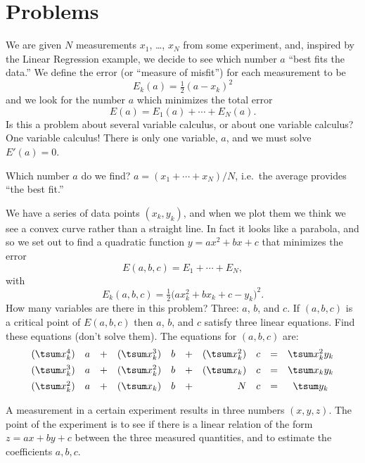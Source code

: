 \section{Problems} 
\begin{multicols}{2}
\problemfont
\problem  We are given $N$ measurements $x_1$, \ldots, $x_N$  
from some experiment, and, inspired by the Linear Regression example,
we decide to see which number $a$ ``best fits the data.''  We define
the error (or ``measure of misfit'') for each measurement to be
\[
E_k(a) = \tfrac12(a-x_k)^2
\]
and we look for the number $a$ which minimizes the total error
\[
E(a) = E_1(a) + \cdots + E_N(a).
\]
\subprob  Is this a problem about several variable calculus, or about 
one variable calculus?
\answer  
One variable calculus!  There is only one variable, $a$, and we must
solve $E'(a) = 0$.
\endanswer

\subprob Which number $a$ do we find? 
\answer  
$a= (x_1+\cdots+x_N)/N$, i.e.\ the average provides ``the best fit.''
\endanswer

\problem We have a series of data points $(x_k, y_k)$,  
and when we plot them we think we see a convex curve rather than a
straight line.  In fact it looks like a parabola, and so we
set out to find a quadratic function $y=ax^2+bx+c$ that minimizes the
error
\[
E(a,b,c)=E_1+\cdots+E_N,
\]
with
\[
E_k(a, b, c) = \tfrac12\bigl(ax_k^2+bx_k+c - y_k\bigr)^2.
\]
\subprob How many variables are there in this problem? 
\answer Three:  $a$, $b$, and $c$. 
\endanswer
\subprob If $(a, b, c)$ is a critical point of $E(a, b, c)$  
then $a$, $b$, and $c$ satisfy three linear equations.  Find these
equations (don't solve them).
\answer The equations for $(a, b, c)$ are:   
\[
\begin{array}{rlcrlcrlrcl}
    (\tsum x_k^4)&a &+&(\tsum x_k^3)&b &+& (\tsum x_k^2)&c 
    &=& \tsum x_k^2y_k\\[1ex]
    (\tsum x_k^3)&a &+&(\tsum x_k^2)&b &+& (\tsum x_k)&c 
    &=& \tsum x_ky_k\\[1ex]
    (\tsum x_k^2)&a &+&(\tsum x_k)&b &+& N&c &=& \tsum y_k
\end{array}
\]
\endanswer

\problem A measurement in a certain experiment results 
in three numbers $(x, y, z)$.  The point of the experiment is to see
if there is a linear relation of the form $z=ax+by+c$ between the
three measured quantities, and to estimate the coefficients $a, b, c$.


\end{multicols}
